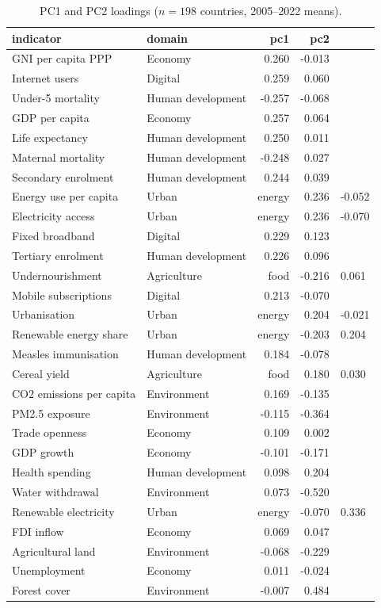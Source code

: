 \begin{table}[t]
\centering
\caption{PC1 and PC2 loadings ($n=198$ countries, 2005--2022 means).}
\label{tab:loadings}
\small
\begin{tabular}{llrr}
\toprule
\textbf{indicator} & \textbf{domain} & \textbf{pc1} & \textbf{pc2} \\
\midrule
GNI per capita PPP & Economy & 0.260 & -0.013 \\
Internet users & Digital & 0.259 & 0.060 \\
Under-5 mortality & Human development & -0.257 & -0.068 \\
GDP per capita & Economy & 0.257 & 0.064 \\
Life expectancy & Human development & 0.250 & 0.011 \\
Maternal mortality & Human development & -0.248 & 0.027 \\
Secondary enrolment & Human development & 0.244 & 0.039 \\
Energy use per capita & Urban & energy & 0.236 & -0.052 \\
Electricity access & Urban & energy & 0.236 & -0.070 \\
Fixed broadband & Digital & 0.229 & 0.123 \\
Tertiary enrolment & Human development & 0.226 & 0.096 \\
Undernourishment & Agriculture & food & -0.216 & 0.061 \\
Mobile subscriptions & Digital & 0.213 & -0.070 \\
Urbanisation & Urban & energy & 0.204 & -0.021 \\
Renewable energy share & Urban & energy & -0.203 & 0.204 \\
Measles immunisation & Human development & 0.184 & -0.078 \\
Cereal yield & Agriculture & food & 0.180 & 0.030 \\
CO2 emissions per capita & Environment & 0.169 & -0.135 \\
PM2.5 exposure & Environment & -0.115 & -0.364 \\
Trade openness & Economy & 0.109 & 0.002 \\
GDP growth & Economy & -0.101 & -0.171 \\
Health spending & Human development & 0.098 & 0.204 \\
Water withdrawal & Environment & 0.073 & -0.520 \\
Renewable electricity & Urban & energy & -0.070 & 0.336 \\
FDI inflow & Economy & 0.069 & 0.047 \\
Agricultural land & Environment & -0.068 & -0.229 \\
Unemployment & Economy & 0.011 & -0.024 \\
Forest cover & Environment & -0.007 & 0.484 \\
\bottomrule
\end{tabular}
\end{table}
